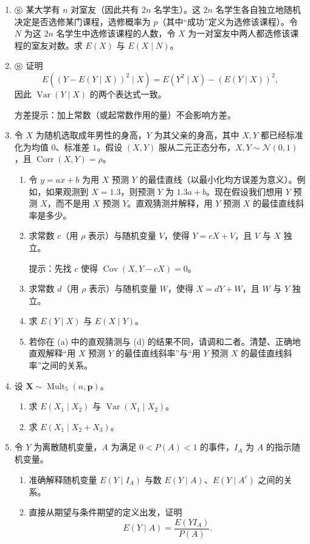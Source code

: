 \documentclass[UTF8, 12pt, fontset=fandol, oneside]{ctexart}
\begin{document}
\begin{enumerate}
  \item $\circledS$ 某大学有 $n$ 对室友（因此共有 $2n$ 名学生）。这 $2n$ 名学生各自独立地随机决定是否选修某门课程，选修概率为 $p$（其中“成功”定义为选修该课程）。令 $N$ 为这 $2n$ 名学生中选修该课程的人数，令 $X$ 为一对室友中两人都选修该课程的室友对数。求 $E(X)$ 与 $E(X\mid N)$。

  \item $\circledS$ 证明
  \[
    E((Y-E(Y\mid X))^2\mid X)=E(Y^2\mid X)-(E(Y\mid X))^2,
  \]
  因此 $\operatorname{Var}(Y\mid X)$ 的两个表达式一致。

  \noindent 方差提示：加上常数（或起常数作用的量）不会影响方差。

  \item 令 $X$ 为随机选取成年男性的身高，$Y$ 为其父亲的身高，其中 $X,Y$ 都已经标准化为均值 $0$、标准差 $1$。假设 $(X,Y)$ 服从二元正态分布，$X,Y\sim\mathcal N(0,1)$，且 $\operatorname{Corr}(X,Y)=\rho$。
  \begin{enumerate}
    \item[(a)] 令 $y=ax+b$ 为用 $X$ 预测 $Y$ 的最佳直线（以最小化均方误差为意义）。例如，如果观测到 $X=1.3$，则预测 $Y$ 为 $1.3a+b$。现在假设我们想用 $Y$ 预测 $X$，而不是用 $X$ 预测 $Y$。直观猜测并解释，用 $Y$ 预测 $X$ 的最佳直线斜率是多少。
    \item[(b)] 求常数 $c$（用 $\rho$ 表示）与随机变量 $V$，使得 $Y=cX+V$，且 $V$ 与 $X$ 独立。

    \noindent 提示：先找 $c$ 使得 $\operatorname{Cov}(X,Y-cX)=0$。

    \item[(c)] 求常数 $d$（用 $\rho$ 表示）与随机变量 $W$，使得 $X=dY+W$，且 $W$ 与 $Y$ 独立。
    \item[(d)] 求 $E(Y\mid X)$ 与 $E(X\mid Y)$。
    \item[(e)] 若你在 (a) 中的直观猜测与 (d) 的结果不同，请调和二者。清楚、正确地直观解释“用 $X$ 预测 $Y$ 的最佳直线斜率”与“用 $Y$ 预测 $X$ 的最佳直线斜率”之间的关系。
  \end{enumerate}

  \item 设 $\mathbf X\sim\operatorname{Mult}_5(n,\mathbf p)$。
  \begin{enumerate}
    \item[(a)] 求 $E(X_1\mid X_2)$ 与 $\operatorname{Var}(X_1\mid X_2)$。
    \item[(b)] 求 $E(X_1\mid X_2+X_3)$。
  \end{enumerate}

  \item 令 $Y$ 为离散随机变量，$A$ 为满足 $0<P(A)<1$ 的事件，$I_A$ 为 $A$ 的指示随机变量。
  \begin{enumerate}
    \item[(a)] 准确解释随机变量 $E(Y\mid I_A)$ 与数 $E(Y\mid A)$、$E(Y\mid A^c)$ 之间的关系。
    \item[(b)] 直接从期望与条件期望的定义出发，证明
    \[
      E(Y\mid A)=\frac{E(YI_A)}{P(A)}.
    \]


\end{enumerate}
\end{enumerate}
\end{document}
